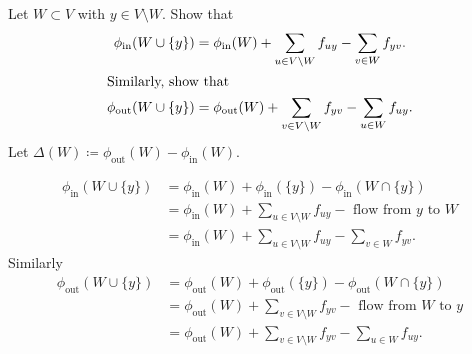 \documentclass[10pt, a4paper]{article}
\begin{document}
\begin{example}
    Let $W \subset V$ with $y \in V \setminus W$.
    Show that
    \begin{align*}
        \phi_{\text{in}}(W \cup \{y\}) &= \phi_{\text{in}}(W) + \sum_{u \in V \setminus W}f_{uy} - \sum_{v \in W}f_{yv}. \\
        \intertext{Similarly,
        show that}
        \phi_{\text{out}}(W \cup \{y\}) &= \phi_{\text{out}}(W) + \sum_{v \in V \setminus W}f_{yv} - \sum_{u \in W}f_{uy}.
    \end{align*}
    Let $\Delta(W) \coloneqq \phi_{\text{out}}(W) - \phi_{\text{in}}(W)$.

    \begin{solution}
        \begin{align*}
            \phi_{\text{in}}(W \cup \{y\}) &= \phi_{\text{in}}(W) + \phi_{\text{in}}(\{y\}) - \phi_{\text{in}}(W \cap \{y\}) \\
            &= \phi_{\text{in}}(W) + \sum_{u \in V \setminus W}f_{uy} - \text{ flow from $y$ to $W$} \\
            &=\phi_{\text{in}}(W) + \sum_{u \in V \setminus W}f_{uy} - \sum_{v \in W}f_{yv}.
        \end{align*}
        Similarly
        \begin{align*}
            \phi_{\text{out}}(W \cup \{y\}) &= \phi_{\text{out}}(W) + \phi_{\text{out}}(\{y\}) - \phi_{\text{out}}(W \cap \{y\}) \\
            &= \phi_{\text{out}}(W) + \sum_{v \in V \setminus W}f_{yv} - \text{ flow from $W$ to $y$} \\
            &=\phi_{\text{out}}(W) + \sum_{v \in V \setminus W}f_{yv} - \sum_{u \in W}f_{uy}.
        \end{align*}
    \end{solution}
\end{example}
\end{document}
